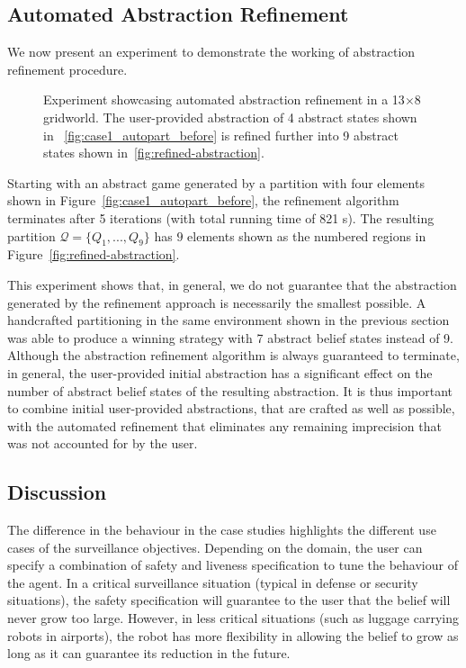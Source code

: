 \subsection{Automated Abstraction Refinement}
We now present an experiment to demonstrate the working of abstraction refinement procedure. 


\begin{figure}
\hfill
{}
\caption{Experiment showcasing automated abstraction refinement in a 13$\times$8 gridworld. The user-provided abstraction of 4 abstract states shown in ~\ref{fig:case1_autopart_before} is refined further into 9 abstract states shown in~\ref{fig:refined-abstraction}.}
\label{fig:case1_autopart}
\end{figure}



Starting with an abstract game generated by a partition with four elements shown in Figure~\ref{fig:case1_autopart_before}, the refinement algorithm terminates after 5 iterations (with total running time of 821 s). The resulting partition $\mathcal{Q} = \{Q_1,...,Q_9 \}$ has $9$ elements shown as the numbered regions in Figure~\ref{fig:refined-abstraction}.

This experiment shows that, in general, we do not guarantee that the abstraction generated by the refinement approach is necessarily the smallest possible. A handcrafted partitioning in the same environment shown in the previous section was able to produce a winning strategy with 7 abstract belief states instead of 9. Although the abstraction refinement algorithm is always guaranteed to terminate, in general, the user-provided initial abstraction has a significant effect on the number of abstract belief states of the resulting abstraction. It is thus important to combine initial user-provided abstractions, that are crafted as well as possible, with the automated refinement that eliminates any remaining imprecision that was not accounted for by the user.

 



\subsection{Discussion}
 The difference in the behaviour in the case studies highlights the different use cases of the surveillance objectives. Depending on the domain, the user can specify a combination of safety and liveness specification to tune the behaviour of the agent. In a critical surveillance situation (typical in defense or security situations), the safety specification will guarantee to the user that the belief will never grow too large. However, in less critical situations (such as luggage carrying robots in airports), the robot has more flexibility in allowing the belief to grow as long as it can guarantee its reduction in the future. 